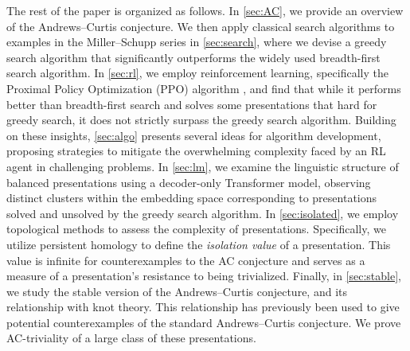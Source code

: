 \medskip The rest of the paper is organized as follows. In \cref{sec:AC}, we provide an overview of the Andrews--Curtis conjecture. We then apply classical search algorithms to examples in the Miller--Schupp series in \cref{sec:search}, where we devise a greedy search algorithm that significantly outperforms the widely used breadth-first search algorithm. In \cref{sec:rl}, we employ reinforcement learning, specifically the Proximal Policy Optimization (PPO) algorithm \cite{schulman2017proximal}, and find that while it performs better than breadth-first search and solves some presentations that hard for greedy search, it does not strictly surpass the greedy search algorithm.
Building on these insights, \cref{sec:algo} presents several ideas for algorithm development, proposing strategies to mitigate the overwhelming complexity faced by an RL agent in challenging problems.
In \cref{sec:lm}, we examine the linguistic structure of balanced presentations using a decoder-only Transformer model, observing distinct clusters within the embedding space corresponding to presentations solved and unsolved by the greedy search algorithm.
In \cref{sec:isolated}, we employ topological methods to assess the complexity of presentations. Specifically, we utilize persistent homology to define the \textit{isolation value} of a presentation. This value is infinite for counterexamples to the AC conjecture and serves as a measure of a presentation's resistance to being trivialized. Finally, in \cref{sec:stable}, we study the stable version of the Andrews--Curtis conjecture, and its relationship with knot theory.
This relationship has previously been used to give potential counterexamples of the standard Andrews--Curtis conjecture. We prove AC-triviality of a large class of these presentations. 



